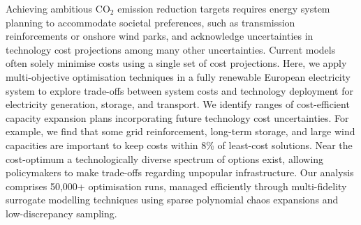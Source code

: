 Achieving ambitious CO$_2$ emission reduction targets requires energy system
planning to accommodate societal preferences, such as transmission
reinforcements or onshore wind parks, and acknowledge uncertainties in
technology cost projections among many other uncertainties. Current models often
solely minimise costs using a single set of cost projections. Here, we apply
multi-objective optimisation techniques in a fully renewable European
electricity system to explore trade-offs between system costs and technology
deployment for electricity generation, storage, and transport. We identify
ranges of cost-efficient capacity expansion plans incorporating future
technology cost uncertainties. For example, we find that some grid
reinforcement, long-term storage, and large wind capacities are important to
keep costs within 8\% of least-cost solutions. Near the cost-optimum a
technologically diverse spectrum of options exist, allowing policymakers to make
trade-offs regarding unpopular infrastructure. Our analysis comprises 50,000+
optimisation runs, managed efficiently through multi-fidelity surrogate
modelling techniques using sparse polynomial chaos expansions and
low-discrepancy sampling.
